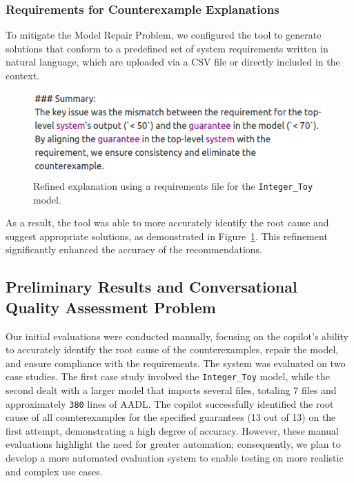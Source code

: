 \subsubsection{Requirements for Counterexample Explanations}

To mitigate the Model Repair Problem, we configured the tool to generate solutions that conform to a predefined set of system requirements written in natural language, which are uploaded via a CSV file or directly included in the context. 

\begin{figure}[t]  
    \centering
    \includegraphics[width=0.95\columnwidth]{REQ-AWARE-REF-high-res.png}  
    \caption{Refined explanation using a requirements file for the \texttt{Integer\_Toy} model.}
    \label{fig:REQ-AWARE-EXPL}
\end{figure}


As a result, the tool was able to more accurately identify the root cause and suggest appropriate solutions, as demonstrated in Figure~\ref{fig:REQ-AWARE-EXPL}.
%
%
This refinement significantly enhanced the accuracy of the recommendations.


\subsection{Preliminary Results and Conversational Quality Assessment Problem}
 
Our initial evaluations were conducted manually, focusing on the copilot's ability to accurately identify the root cause of the counterexamples, repair the model, and ensure compliance with the requirements. The system was evaluated on two case studies. The first case study involved the \texttt{Integer\_Toy} model, while the second dealt with a larger model that imports several files, totaling 7 files and approximately \texttt{380} lines of AADL. The copilot successfully identified the root cause of all counterexamples for the specified guarantees (13 out of 13) on the first attempt, demonstrating a high degree of accuracy.
%
However, these manual evaluations highlight the need for greater automation; consequently, we plan to develop a more automated evaluation system to enable testing on more realistic and complex use cases.
 

